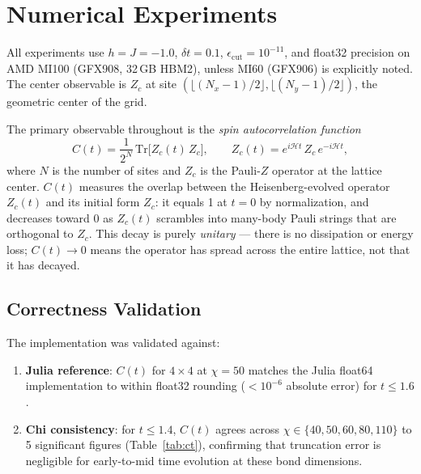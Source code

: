 \documentclass[11pt]{article}
\newcommand{\Ct}{C(t)}
\begin{document}
\section{Numerical Experiments}
\label{sec:experiments}

All experiments use $h = J = -1.0$, $\delta t = 0.1$,
$\epsilon_{\mathrm{cut}} = 10^{-11}$, and float32 precision on AMD MI100
(GFX908, 32\,GB HBM2), unless MI60 (GFX906) is explicitly noted.
The center observable is $Z_c$ at site $(\lfloor(N_x-1)/2\rfloor,\lfloor(N_y-1)/2\rfloor)$,
the geometric center of the grid.

The primary observable throughout is the \emph{spin autocorrelation function}
\begin{equation}
  C(t) = \frac{1}{2^N}\,\mathrm{Tr}\bigl[Z_c(t)\,Z_c\bigr],
  \qquad
  Z_c(t) = e^{i\mathcal{H}t}\,Z_c\,e^{-i\mathcal{H}t},
  \label{eq:ct_def}
\end{equation}
where $N$ is the number of sites and $Z_c$ is the Pauli-$Z$ operator at the
lattice center.
$C(t)$ measures the overlap between the Heisenberg-evolved operator $Z_c(t)$
and its initial form $Z_c$: it equals 1 at $t=0$ by normalization, and
decreases toward 0 as $Z_c(t)$ scrambles into many-body Pauli strings
that are orthogonal to $Z_c$.
This decay is purely \emph{unitary} --- there is no dissipation or energy loss;
$C(t) \to 0$ means the operator has spread across the entire lattice,
not that it has decayed.

\subsection{Correctness Validation}
\label{sec:correctness}

The implementation was validated against:
\begin{enumerate}
  \item \textbf{Julia reference}: $\Ct$ for $4\times4$ at $\chi=50$ matches the
        Julia float64 implementation to within float32 rounding
        ($<10^{-6}$ absolute error) for $t \leq 1.6$.
  \item \textbf{Chi consistency}: for $t \leq 1.4$, $\Ct$ agrees across
        $\chi \in \{40, 50, 60, 80, 110\}$ to 5 significant figures
        (Table~\ref{tab:ct}), confirming that truncation error is negligible
        for early-to-mid time evolution at these bond dimensions.
\end{enumerate}
\end{document}
